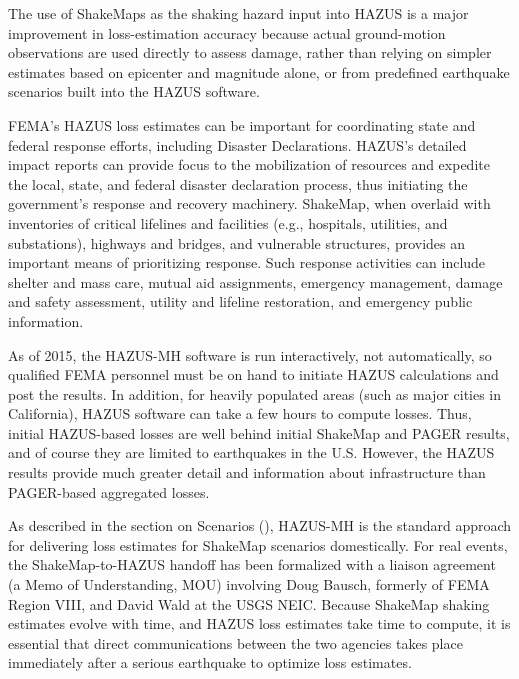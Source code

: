 \documentclass[letterpaper,10pt,english]{sphinxmanual}
\begin{document}
The use of ShakeMaps as the shaking hazard input into HAZUS is a major improvement in loss-estimation accuracy
because actual ground-motion observations are used directly to assess damage, rather than relying on simpler
estimates based on epicenter and magnitude alone, or from predefined earthquake scenarios built into the HAZUS software.

FEMA's HAZUS loss estimates can be important for coordinating state and federal
response efforts, including Disaster Declarations. HAZUS's detailed impact
reports can provide focus to the mobilization of resources and
expedite the local, state, and federal disaster declaration process, thus
initiating the government’s response and
recovery machinery. ShakeMap, when overlaid with inventories of
critical lifelines and
facilities (e.g., hospitals, utilities, and substations), highways and
bridges, and vulnerable structures,
provides an important means of prioritizing response. Such response activities
can include shelter and mass care,
mutual aid assignments, emergency management, damage and safety assessment,
utility and lifeline restoration,
and emergency public information.
\begin{figure}[htbp]\begin{flushleft}
\capstart
\texttt{[image: \{parkfield\_hazus]}.png}\caption{2004 M6.0 Parkfield, CA earthquake ShakeMap shapefiles (green polygons) and HAZUS estimated impact to selected
infrastructure (circles) examined. Figure courtesy of D. Bausch, FEMA.}\label{shakemap_applications:id3}\end{flushleft}\end{figure}

As of 2015, the HAZUS-MH software is run interactively, not automatically, so
qualified FEMA personnel must be on hand to initiate HAZUS calculations and post
the results. In addition, for heavily populated areas (such as major cities in
California), HAZUS software can take a few hours to
compute losses. Thus, initial HAZUS-based losses are well behind initial
ShakeMap and PAGER results, and of course they are limited to
earthquakes in the U.S. However, the HAZUS results provide much greater detail and
information about infrastructure than PAGER-based aggregated losses.

As described in the section on Scenarios ({\hyperref[shakemap_archives:sec\string-shakemap\string-archives]{}}), HAZUS-MH is the standard approach for
delivering loss estimates for ShakeMap scenarios domestically. For real events,
the ShakeMap-to-HAZUS handoff has been formalized with a
liaison agreement (a Memo of Understanding, MOU) involving Doug Bausch, formerly
of FEMA Region VIII, and David Wald at the USGS NEIC. Because ShakeMap shaking
estimates evolve with time, and HAZUS loss estimates take time to compute, it is
essential that direct communications between the two agencies takes place
immediately after a serious earthquake to optimize loss
estimates.
\end{document}
